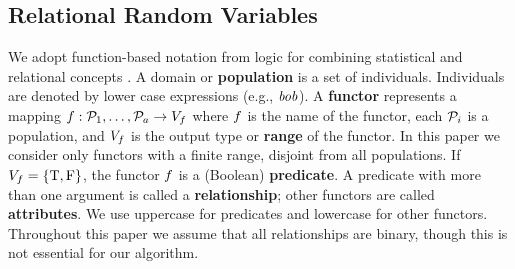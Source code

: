 \documentclass{sig-alternate-2013}
\begin{document}

\subsection{Relational Random Variables} \label{sec:variables}
We adopt function-based notation from logic for combining statistical and relational concepts \cite{Russell2010}.
A domain or \textbf{population} is a set of individuals.
Individuals are denoted by lower case expressions (e.g., $\it{bob}$). 
A \textbf{functor} represents a mapping
$f: \mathcal{P}_{1},\ldots,\mathcal{P}_{a} \rightarrow V_{f}$
where $f$ is the name of the functor, each $\mathcal{P}_{i}$ is a population, and $V_{f}$ is the output type or \textbf{range} of the functor. 
In this paper we consider only functors with a finite range, disjoint from all populations.  If $V_{f} = \{\mathrm{T},\mathrm{F}\}$, the functor $f$ is a (Boolean) \textbf{predicate}. A predicate with more than one argument is called a \textbf{relationship}; other functors are called \textbf{attributes}. We use uppercase for predicates and lowercase for other functors. Throughout this paper we assume that all relationships are binary, though this is not essential for our algorithm.
\end{document}
